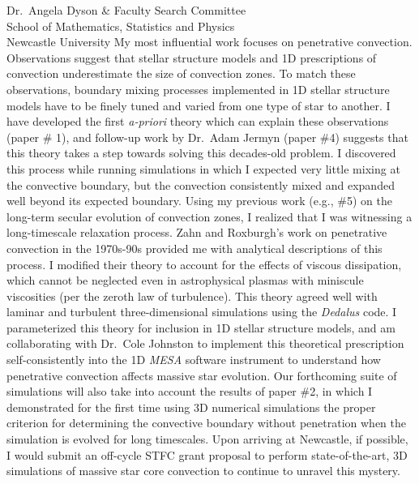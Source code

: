 \documentclass[12pt, a4paper]{letter}
\begin{document}
\begin{letter}{
        Dr.~Angela Dyson \& Faculty Search Committee \\
        School of Mathematics, Statistics and Physics \\
        Newcastle University}
    My most influential work focuses on penetrative convection.
    Observations suggest that stellar structure models and 1D prescriptions of convection underestimate the size of convection zones.
    To match these observations, boundary mixing processes implemented in 1D stellar structure models have to be finely tuned and varied from one type of star to another.
    I have developed the first \emph{a-priori} theory which can explain these observations (paper \# 1), and follow-up work by Dr.~Adam Jermyn (paper \#4) suggests that this theory takes a step towards solving this decades-old problem.
    I discovered this process while running simulations in which I expected very little mixing at the convective boundary, but the convection consistently mixed and expanded well beyond its expected boundary.
    Using my previous work (e.g., \#5) on the long-term secular evolution of convection zones, I realized that I was witnessing a long-timescale relaxation process.
    Zahn and Roxburgh's work on penetrative convection in the 1970s-90s provided me with analytical descriptions of this process.
    I modified their theory to account for the effects of viscous dissipation, which cannot be neglected even in astrophysical plasmas with miniscule viscosities (per the zeroth law of turbulence).
    This theory agreed well with laminar and turbulent three-dimensional simulations using the \emph{Dedalus} code.
    I parameterized this theory for inclusion in 1D stellar structure models, and am collaborating with Dr.~Cole Johnston to implement this theoretical prescription self-consistently into the 1D \emph{MESA} software instrument to understand how penetrative convection affects massive star evolution.
    Our forthcoming suite of simulations will also take into account the results of paper \#2, in which I demonstrated for the first time using 3D numerical simulations the proper criterion for determining the convective boundary without penetration when the simulation is evolved for long timescales.
    Upon arriving at Newcastle, if possible, I would submit an off-cycle STFC grant proposal to perform state-of-the-art, 3D simulations of massive star core convection to continue to unravel this mystery.


\end{letter}
\end{document}
